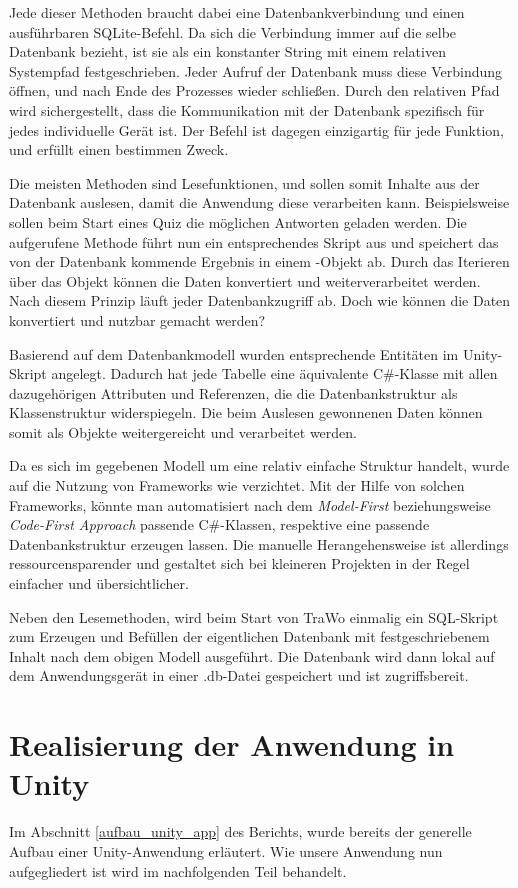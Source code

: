 Jede dieser Methoden braucht dabei eine Datenbankverbindung und einen ausführbaren SQLite-Befehl. Da sich die Verbindung immer auf die selbe Datenbank bezieht, ist sie als ein konstanter String mit einem relativen Systempfad festgeschrieben. Jeder Aufruf der Datenbank muss diese Verbindung öffnen, und nach Ende des Prozesses wieder schließen. Durch den relativen Pfad wird sichergestellt, dass die Kommunikation mit der Datenbank spezifisch für jedes individuelle Gerät ist. Der Befehl ist dagegen einzigartig für jede Funktion, und erfüllt einen bestimmen Zweck.

Die meisten Methoden sind Lesefunktionen, und sollen somit Inhalte aus der Datenbank auslesen, damit die Anwendung diese verarbeiten kann. Beispielsweise sollen beim Start eines Quiz die möglichen Antworten geladen werden. Die aufgerufene Methode führt nun ein entsprechendes Skript aus und speichert das von der Datenbank kommende Ergebnis in einem -Objekt ab. Durch das Iterieren über das Objekt können die Daten konvertiert und weiterverarbeitet werden. Nach diesem Prinzip läuft jeder Datenbankzugriff ab. Doch wie können die Daten konvertiert und nutzbar gemacht werden?

Basierend auf dem Datenbankmodell wurden entsprechende Entitäten im Unity-Skript angelegt. Dadurch hat jede Tabelle eine äquivalente C\#-Klasse mit allen dazugehörigen Attributen und Referenzen, die die Datenbankstruktur als Klassenstruktur widerspiegeln. Die beim Auslesen gewonnenen Daten können somit als Objekte weitergereicht und verarbeitet werden. 

Da es sich im gegebenen Modell um eine relativ einfache Struktur handelt, wurde auf die Nutzung von Frameworks wie  verzichtet. Mit der Hilfe von solchen Frameworks, könnte man automatisiert nach dem \textit{Model-First} beziehungsweise \textit{Code-First Approach} passende C\#-Klassen, respektive eine passende Datenbankstruktur erzeugen lassen. Die manuelle Herangehensweise ist allerdings ressourcensparender und gestaltet sich bei kleineren Projekten in der Regel einfacher und übersichtlicher.

Neben den Lesemethoden, wird beim Start von TraWo einmalig ein SQL-Skript zum Erzeugen und Befüllen der eigentlichen Datenbank mit festgeschriebenem Inhalt nach dem obigen Modell ausgeführt. Die Datenbank wird dann lokal auf dem Anwendungsgerät in einer .db-Datei gespeichert und ist zugriffsbereit. 

\section{Realisierung der Anwendung in Unity}
Im Abschnitt \ref{aufbau_unity_app} des Berichts, wurde bereits der generelle Aufbau einer Unity-Anwendung erläutert.
Wie unsere Anwendung nun aufgegliedert ist wird im nachfolgenden Teil behandelt.

